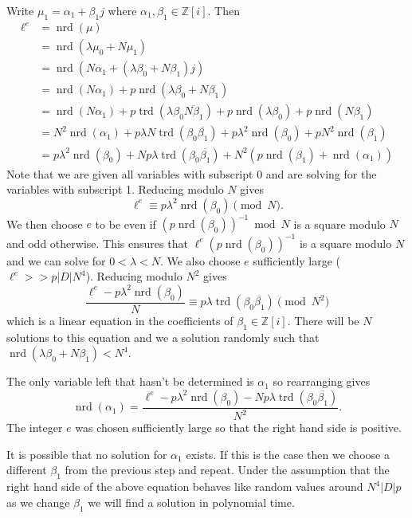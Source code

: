 \documentclass[10pt]{article}
\theoremstyle{plain}
\theoremstyle{definition}
\newcommand{\op}{\operatorname}
\newcommand{\Z}{\mathbb{Z}}
\newcommand{\nrd}{\op{nrd}}
\newcommand{\trd}{\op{trd}}
\begin{document}
Write \( \mu_1 = \alpha_1 + \beta_1j \) where \( \alpha_1, \beta_1 \in \Z[i] \).
Then
\begin{align*}
    \ell^e
      & = \nrd(\mu)                                                                                                      \\
      & = \nrd(\lambda \mu_0 + N \mu_1)                                                                                  \\
      & = \nrd(N\alpha_1 + (\lambda\beta_0 + N\beta_1)j)                                                                 \\
      & = \nrd(N\alpha_1) +p\nrd(\lambda\beta_0 + N\beta_1)                                                              \\
      & = \nrd(N\alpha_1) + p\trd(\lambda \beta_0\overline{N\beta_1}) + p\nrd(\lambda\beta_0) + p\nrd(N\beta_1)          \\
      & = N^2\nrd(\alpha_1) +  p\lambda N \trd(\beta_0\overline{\beta_1}) + p\lambda^2 \nrd(\beta_0) + pN^2\nrd(\beta_1) \\
      & = p\lambda^2 \nrd(\beta_0) + Np\lambda \trd(\beta_0\overline{\beta_1}) + N^2(p\nrd(\beta_1) + \nrd(\alpha_1))
\end{align*}
Note that we are given all variables with subscript 0 and are solving for the variables with subscript 1.
Reducing modulo \( N \) gives
\[
    \ell^e \equiv p\lambda^2\nrd(\beta_0) \pmod{N}.
\]
We then choose \( e \) to be even if \( (p\nrd(\beta_0))^{-1} \bmod{N} \) is a square modulo \( N \) and odd otherwise.
This ensures that \( \ell^e(p\nrd(\beta_0))^{-1} \) is a square modulo \( N \) and we can solve for \( 0 <  \lambda < N\).
We also choose \( e \) sufficiently large (\( \ell^e >> p|D|N^4 \)).
Reducing modulo \( N^2 \) gives
\[
    \frac{\ell^e - p\lambda^2\nrd(\beta_0)}{N}\equiv p\lambda \trd(\beta_0\overline{\beta_1}) \pmod{N^2}
\]
which is a linear equation in the coefficients of \( \beta_1 \in \Z[i]\).
There will be \( N \) solutions to this equation and we a solution randomly such that \( \nrd(\lambda\beta_0 + N\beta_1) < N^4 \).

The only variable left that hasn't be determined is \( \alpha_1 \) so rearranging gives
\[
    \nrd(\alpha_1) = \frac{\ell^e - p\lambda^2 \nrd(\beta_0) - Np\lambda \trd(\beta_0\overline{\beta_1})}{N^2}.
\]
The integer \( e \) was chosen sufficiently large so that the right hand side is positive.

It is possible that no solution for \( \alpha_1 \) exists.
If this is the case then we choose a different \( \beta_1 \) from the previous step and repeat.
Under the assumption that the right hand side of the above equation behaves like random values around \( N^4|D|p \) as we change \( \beta_1 \) we will find a solution in polynomial time.
\end{document}
